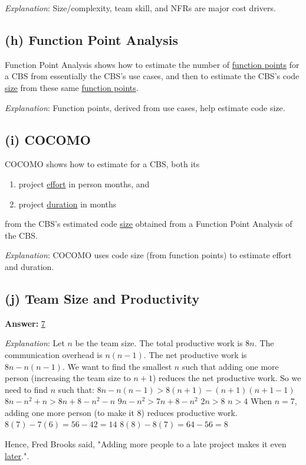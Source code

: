\documentclass{article}
\begin{document}
\textit{Explanation}: Size/complexity, team skill, and NFRs are major cost drivers.

\subsection*{(h) Function Point Analysis}

Function Point Analysis shows how to estimate the number of \underline{function points} for a CBS from essentially the CBS's use cases, and then to estimate the CBS's code \underline{size} from these same \underline{function points}.

\textit{Explanation}: Function points, derived from use cases, help estimate code size.

\subsection*{(i) COCOMO}

COCOMO shows how to estimate for a CBS, both its
\begin{enumerate}
    \item project \underline{effort} in person months, and
    \item project \underline{duration} in months
\end{enumerate}
from the CBS's estimated code \underline{size} obtained from a Function Point Analysis of the CBS.

\textit{Explanation}: COCOMO uses code size (from function points) to estimate effort and duration.

\subsection*{(j) Team Size and Productivity}

\textbf{Answer:} \underline{7}

\textit{Explanation}: Let $n$ be the team size. The total productive work is $8n$. The communication overhead is $n(n-1)$. The net productive work is $8n - n(n-1)$.
We want to find the smallest $n$ such that adding one more person (increasing the team size to $n+1$) reduces the net productive work. So we need to find $n$ such that:
$8n - n(n-1) > 8(n+1) - (n+1)(n+1-1)$
$8n - n^2 + n > 8n + 8 - n^2 - n$
$9n - n^2 > 7n + 8 - n^2$
$2n > 8$
$n > 4$
When $n=7$, adding one more person (to make it 8) reduces productive work.
$8(7) - 7(6) = 56 - 42 = 14$
$8(8) - 8(7) = 64 - 56 = 8$

Hence, Fred Brooks said, "Adding more people to a late project makes it even \underline{later}.".
\end{document}
